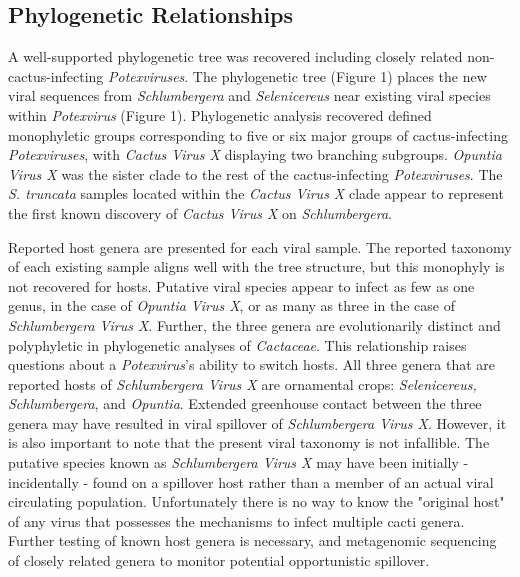 \documentclass[fleqn,10pt,lineno]{wlpeerj}
\begin{document}
\subsection*{Phylogenetic Relationships}
A well-supported phylogenetic tree was recovered including closely related non-cactus-infecting \textit{Potexviruses}.
The phylogenetic tree (Figure 1) places the new viral sequences from \textit{Schlumbergera} and \textit{Selenicereus} near existing viral species within \textit{Potexvirus} (Figure 1). 
Phylogenetic analysis recovered defined monophyletic groups corresponding to five or six major groups of cactus-infecting \textit{Potexviruses}, with \textit{Cactus Virus X} displaying two branching subgroups.
\textit{Opuntia Virus X} was the sister clade to the rest of the cactus-infecting \textit{Potexviruses}.
The \textit{S. truncata }samples located within the \textit{Cactus Virus X }clade appear to represent the first known discovery of \textit{Cactus Virus X} on \textit{Schlumbergera}.

Reported host genera are presented for each viral sample. 
The reported taxonomy of each existing sample aligns well with the tree structure, but this monophyly is not recovered for hosts.
Putative viral species appear to infect as few as one genus, in the case of \textit{Opuntia Virus X}, or as many as three in the case of \textit{Schlumbergera Virus X}.
Further, the three genera are evolutionarily distinct and polyphyletic in phylogenetic analyses of \textit{Cactaceae}. 
This relationship raises questions about a \textit{Potexvirus}'s ability to switch hosts. %
All three genera that are reported hosts of \textit{Schlumbergera Virus X} are ornamental crops: \textit{Selenicereus, Schlumbergera}, and \textit{Opuntia}.
Extended greenhouse contact between the three genera may have resulted in viral spillover of \textit{Schlumbergera Virus X}.
However, it is also important to note that the present viral taxonomy is not infallible. 
The putative species known as \textit{Schlumbergera Virus X} may have been initially - incidentally - found on a spillover host rather than a member of an actual viral circulating population.
Unfortunately there is no way to know the "original host" of any virus that possesses the mechanisms to infect multiple cacti genera. 
Further testing of known host genera is necessary, and metagenomic sequencing of closely related genera to monitor potential opportunistic spillover. 
\end{document}
